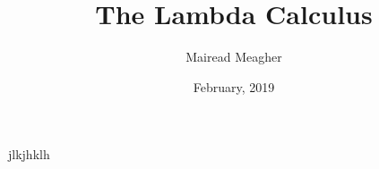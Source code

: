 \documentclass{article}
\title{The Lambda Calculus}
\author[MM]{Mairead Meagher}
\date{February, 2019}
\begin{document}
jlkjhklh
\end{document}
